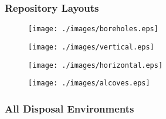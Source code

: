 \begin{frame}
  \frametitle{Repository Layouts}

  \begin{minipage}{0.49\textwidth}
    \begin{figure}[h!]
      \texttt{[image: ./images/boreholes.eps]}
    \end{figure}
    \begin{figure}[h!]
      \texttt{[image: ./images/vertical.eps]}
    \end{figure}
  \end{minipage}
  \hspace{0.01cm}
  \begin{minipage}{0.49\textwidth}
    \begin{figure}[h!]
      \texttt{[image: ./images/horizontal.eps]}
    \end{figure}
    \begin{figure}[h!]
      \texttt{[image: ./images/alcoves.eps]}
    \end{figure}
  \end{minipage}

\end{frame}

\begin{frame}[ctb!]
  \frametitle{All Disposal Environments}
  
\end{frame}

